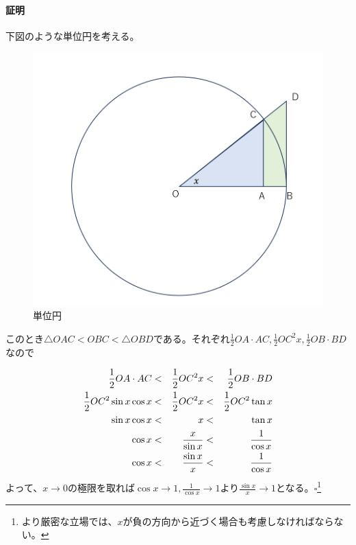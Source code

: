 \documentclass[a4j,dvipdfmx]{jsarticle}
\begin{document}
                \paragraph{証明}下図のような単位円を考える。
                \begin{figure}[h]
                    \centering
                    \includegraphics[keepaspectratio,scale=0.3]{img/QuuNote/circleFor_sin_div_xLimit.png}
                    \caption{単位円}
                \end{figure}

                このとき$\triangle OAC< OBC < \triangle OBD$である。それぞれ$\frac{1}{2}OA\cdot AC,\frac{1}{2}OC^2x,\frac{1}{2}OB\cdot BD$なので
                
                \begin{alignat}{3}
                    \frac{1}{2}OA\cdot AC&<& \frac{1}{2}OC^2x &<& \frac{1}{2}OB\cdot BD\notag\\
                    \frac{1}{2}OC^2 \sin x\cos x & < & \frac{1}{2}OC^2 x & < & \frac{1}{2}OC^2\tan x\notag\\
                    \sin x\cos x & < & x & < & \tan x\notag\\
                    \cos x & < & \frac{x}{\sin x} & < & \frac{1}{\cos x}\notag\\
                    \cos x & < & \frac{\sin x}{x} & < & \frac{1}{\cos x}\label{eq:Hasamiuti}
                \end{alignat}
                よって、$x\to 0$の極限を取れば$\displaystyle \cos x\to 1,\frac{1}{\cos x}\to 1$より$\displaystyle\frac{\sin x}{x}\to 1$となる。$\square$\footnote{より厳密な立場では、$x$が負の方向から近づく場合も考慮しなければならない。}\\
\end{document}
